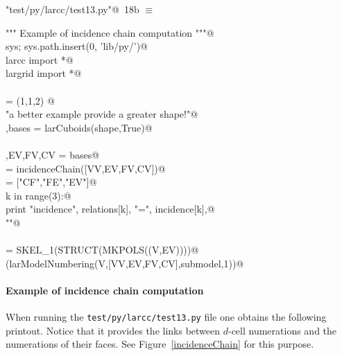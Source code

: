\documentclass[11pt,oneside]{article}	%
\begin{document}
\begin{flushleft} \small \label{scrap32}
\protect{}\verb@"test/py/larcc/test13.py"@\nobreak\ {\footnotesize 18b }$\equiv$
\vspace{-1ex}
\begin{list}{}{} \item
\mbox{}\verb@""" Example of incidence chain computation """@\\
\mbox{}\verb@import sys; sys.path.insert(0, 'lib/py/')@\\
\mbox{}\verb@from larcc import *@\\
\mbox{}\verb@from largrid import *@\\
\mbox{}\verb@@\\
\mbox{}\verb@shape = (1,1,2) @\\
\mbox{}\verb@print "\n\nFor a better example provide a greater shape!"@\\
\mbox{}\verb@V,bases = larCuboids(shape,True)@\\
\mbox{}\verb@@\\
\mbox{}\verb@VV,EV,FV,CV = bases@\\
\mbox{}\verb@incidence = incidenceChain([VV,EV,FV,CV])@\\
\mbox{}\verb@relations = ["CF","FE","EV"]@\\
\mbox{}\verb@for k in range(3):@\\
\mbox{}\verb@   print "\n\n incidence", relations[k], "=\n", incidence[k],@\\
\mbox{}\verb@print "\n\n"@\\
\mbox{}\verb@@\\
\mbox{}\verb@submodel = SKEL_1(STRUCT(MKPOLS((V,EV))))@\\
\mbox{}\verb@VIEW(larModelNumbering(V,[VV,EV,FV,CV],submodel,1))@\\
\mbox{}\verb@@{\NWsep}
\end{list}
\vspace{-2ex}
\end{flushleft}


\paragraph{Example of incidence chain computation}
When running the \texttt{test/py/larcc/test13.py} file one obtains the following printout. 
Notice that 
it provides the links between $d$-cell numerations and the numerations of their faces.
See Figure~\ref{incidenceChain} for this purpose.
\end{document}
